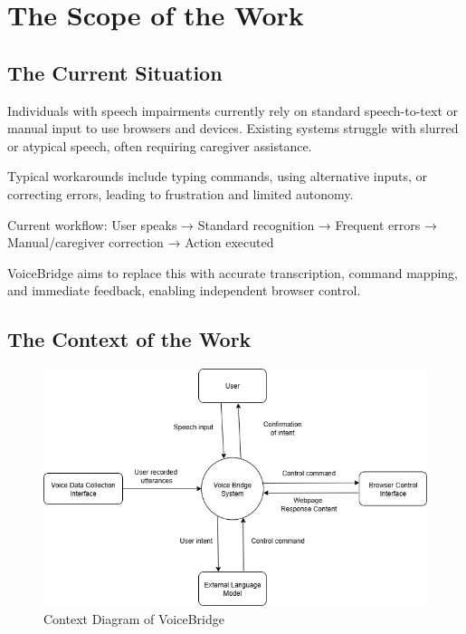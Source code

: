 \documentclass[12pt]{article}
\begin{document}
\section{The Scope of the Work}
\subsection{The Current Situation}

Individuals with speech impairments currently rely on standard speech-to-text or manual input to use browsers and devices. Existing systems struggle with slurred or atypical speech, often requiring caregiver assistance.

Typical workarounds include typing commands, using alternative inputs, or correcting errors, leading to frustration and limited autonomy.

Current workflow:
User speaks → Standard recognition → Frequent errors → Manual/caregiver correction → Action executed

VoiceBridge aims to replace this with accurate transcription, command mapping, and immediate feedback, enabling independent browser control.

\subsection{The Context of the Work}

\begin{figure}[H]
\centering
\includegraphics[width=1\textwidth]{../imgs/VoiceBridge_context_diagram.png}
\caption{Context Diagram of VoiceBridge}
\label{fig:voicebridge-context}
\end{figure}
\end{document}
